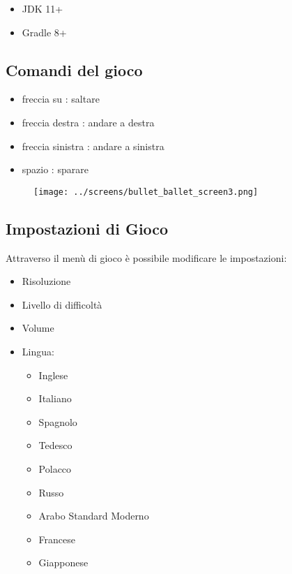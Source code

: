 \begin{itemize}
	\item \textsf{\small JDK 11+}
	\item \textsf{\small Gradle 8+}
\end{itemize}

\subsection{Comandi del gioco}

\begin{itemize}
	\item \textsf{\small freccia su : saltare}
	\item \textsf{\small freccia destra : andare a destra}
	\item \textsf{\small freccia sinistra : andare a sinistra}
	\item \textsf{\small spazio : sparare}
\end{itemize}

\begin{figure}[H]
	\centering{}
	\texttt{[image: ../screens/bullet\_ballet\_screen3.png]}
	\label{img:bullet_ballet_screen3}
\end{figure}

\begin{comment}
\begin{figure}[H]
	\centering{}
	\texttt{[image: ../screens/bullet\_ballet\_screen5.png]}
	\label{img:bullet_ballet_screen5}
\end{figure}
\end{comment}

\subsection{Impostazioni di Gioco}

\textsf{\small Attraverso il menù di gioco è possibile modificare le impostazioni: } \\

\begin{itemize}
	\item \textsf{\small Risoluzione}
	\item \textsf{\small Livello di difficoltà}
	\item \textsf{\small Volume}
	\item \textsf{\small Lingua:}
	\begin{itemize}
		\item \textsf{\small Inglese}
		\item \textsf{\small Italiano}
		\item \textsf{\small Spagnolo}
		\item \textsf{\small Tedesco}
		\item \textsf{\small Polacco}
		\item \textsf{\small Russo}
		\item \textsf{\small Arabo Standard Moderno}
		\item \textsf{\small Francese}
		\item \textsf{\small Giapponese}
	\end{itemize}
\end{itemize}

